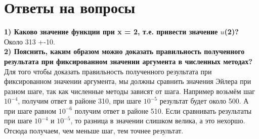 \documentclass[a4paper, 12pt]{article}
\begin{document}
\section{Ответы на вопросы}
\textbf{1) Каково значение функции при x = 2, т.е. привести значение $u$(2)?}
\\Около 313 +-10.
\\ \textbf{2) Пояснить,  каким  образом  можно  доказать  правильность полученного  результата  при фиксированном значении аргумента в численных методах?}
\\ Для того чтобы доказать  правильность полученного  результата  при фиксированном значении аргумента, мы должны сравнить значения Эйлера при разном шаге, так как численные методы зависят от шага. Например возьмём шаг $10^{-4}$, получим ответ в районе 310, при шаге $10^{-5}$ результат будет около 500. А при шаге равном $10^{-6}$ получим ответ в районе 510. Если сравнивать результаты при шаге $10^{-4}$ и $10^{-5}$, то разница в значении слишком велика, а это нехоршо. Отсюда получаем, чем меньше шаг, тем точнее результат.
\end{document}
